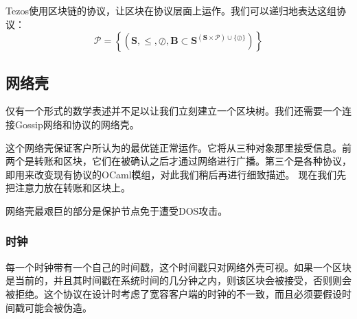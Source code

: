 \documentclass[letterpaper]{article}
\begin{document}
Tezos使用区块链的协议，让区块在协议层面上运作。我们可以递归地表达这组协议：
$$\mathcal{P} = \left\{\left(\mathbf{S},\leq,\oslash,\mathbf{B} \subset
\mathbf{S}^{(\mathbf{S} \times \mathcal{P})\cup \{\oslash\}} \right)\right\}$$

\subsection{网络壳}
仅有一个形式的数学表述并不足以让我们立刻建立一个区块树。我们还需要一个连接Gossip网络和协议的网络壳。

这个网络壳保证客户所认为的最优链正常运作。它将从三种对象那里接受信息。前两个是转账和区块，它们在被确认之后才通过网络进行广播。第三个是各种协议，即用来改变现有协议的OCaml模组，对此我们稍后再进行细致描述。
现在我们先把注意力放在转账和区块上。

网络壳最艰巨的部分是保护节点免于遭受DOS攻击。

\subsubsection{时钟}
每一个时钟带有一个自己的时间戳，这个时间戳只对网络外壳可视。如果一个区块是当前的，并且其时间戳在系统时间的几分钟之内，则该区块会被接受，否则则会被拒绝。这个协议在设计时考虑了宽容客户端的时钟的不一致，而且必须要假设时间戳可能会被伪造。
\end{document}
